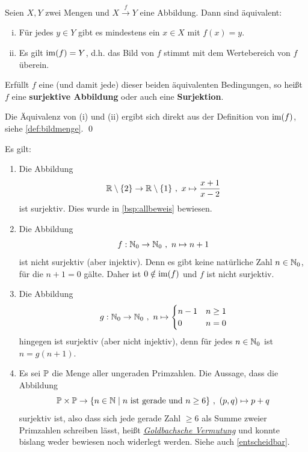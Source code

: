 \begin{defin} \label{def:surjektiv} 
    Seien $X,Y$ zwei Mengen und $X \xrightarrow{f} Y$ eine Abbildung. Dann sind äquivalent:
    \begin{enumerate}[(i)]
        \item Für jedes $y\in Y$ gibt es mindestens ein $x\in X$ mit $f(x)=y$.
        \item Es gilt $\operatorname{im}(f) = Y$, d.h. das Bild von $f$ stimmt mit dem Wertebereich von $f$ überein.
    \end{enumerate}
    Erfüllt $f$ eine (und damit jede) dieser beiden äquivalenten Bedingungen, so heißt $f$ eine \textbf{surjektive Abbildung} oder auch eine \textbf{Surjektion}.
\end{defin}


\begin{bew}
    Die Äquivalenz von (i) und (ii) ergibt sich direkt aus der Definition von $\operatorname{im}(f)$, siehe \cref{def:bildmenge}. \qed
\end{bew}


\begin{bsp} \label{bsp:surjektiv}
    Es gilt:
    \begin{enumerate}
        \item Die Abbildung
            \[ \mathbb R \setminus \{2\} \to \mathbb R \setminus \{1\} \ ,\ x \mapsto \frac{x+1}{x-2} \]
        ist surjektiv. Dies wurde in \cref{bsp:allbeweis} bewiesen.
        \item Die Abbildung
            \[ f:\mathbb N_0 \to \mathbb N_0 \ ,\ n \mapsto n+1 \]
        ist nicht surjektiv (aber injektiv). Denn es gibt keine natürliche Zahl $n\in \mathbb N_0$, für die $n+1=0$ gälte. Daher ist $0\notin \operatorname{im}(f)$ und $f$ ist nicht surjektiv.
        \item Die Abbildung
            \[ g: \mathbb N_0 \to \mathbb N_0\ ,\ n \mapsto \begin{cases}
                n-1 & n\ge 1 \\
                0 & n=0
            \end{cases}\]
        hingegen ist surjektiv (aber nicht injektiv), denn für jedes $n \in \mathbb N_0$ ist $n=g(n+1)$.
        \item Es sei $\mathbb P$ die Menge aller ungeraden Primzahlen. Die Aussage, dass die Abbildung
            \[ \mathbb P \times \mathbb P \to \{n\in \mathbb N \mid n\ \text{ist gerade und}\ n\ge 6\} \ ,\ (p,q) \mapsto p+q \]
        surjektiv ist, also dass sich jede gerade Zahl $\ge 6$ als Summe zweier Primzahlen schreiben lässt, heißt \href{https://de.wikipedia.org/wiki/Goldbachsche_Vermutung}{\emph{Goldbachsche Vermutung}} und konnte bislang weder bewiesen noch widerlegt werden. Siehe auch \cref{entscheidbar}.
    \end{enumerate}
\end{bsp}


